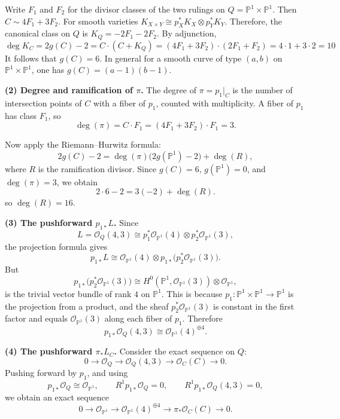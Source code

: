 \documentclass[12pt]{article}
\begin{document}
\begin{solution}
    Write \(F_1\) and \(F_2\) for the divisor classes of the two rulings on \(Q=\mathbb P^1\times \mathbb P^1\). Then $C \sim 4F_1+3F_2$. For smooth varieties $K_{X\times Y}\cong p_X^*K_X\otimes p_Y^*K_Y$. Therefore, the canonical class on \(Q\) is $K_Q = -2F_1-2F_2$.
    By adjunction,
    \[ \deg K_C = 2g(C)-2 = C\cdot (C+K_Q) = 
        (4F_1+3F_2)\cdot (2F_1+F_2)
        =
        4\cdot 1 + 3\cdot 2
        =
        10\] It follows that $g(C)=6$.
    In general for a smooth curve of type \((a,b)\) on \(\mathbb P^1\times \mathbb P^1\), one has $g(C)=(a-1)(b-1)$. 

    \textbf{(2) Degree and ramification of \(\pi\).}
    The degree of \(\pi=p_1|_C\) is the number of intersection points of \(C\) with a fiber of \(p_1\), counted with multiplicity. A fiber of \(p_1\) has class \(F_1\), so
    \[
        \deg(\pi)=C\cdot F_1=(4F_1+3F_2)\cdot F_1=3.
    \]

    Now apply the Riemann--Hurwitz formula:
    \[
        2g(C)-2 = \deg(\pi)\bigl(2g(\mathbb P^1)-2\bigr)+\deg(R),
    \]
    where \(R\) is the ramification divisor. Since \(g(C)=6\), \(g(\mathbb P^1)=0\), and \(\deg(\pi)=3\), we obtain
    \[
        2\cdot 6-2 = 3(-2)+\deg(R).
    \]
    so $\deg(R)=16$.

    \textbf{(3) The pushforward \(p_{1*}L\).}
    Since
    \[
        L=\mathcal O_Q(4,3)\cong p_1^*\mathcal O_{\mathbb P^1}(4)\otimes p_2^*\mathcal O_{\mathbb P^1}(3),
    \]
    the projection formula gives
    \[
        p_{1*}L
        \cong
        \mathcal O_{\mathbb P^1}(4)\otimes p_{1*}\bigl(p_2^*\mathcal O_{\mathbb P^1}(3)\bigr).
    \]
    But
    \[
        p_{1*}\bigl(p_2^*\mathcal O_{\mathbb P^1}(3)\bigr)
        \cong
        H^0(\mathbb P^1,\mathcal O_{\mathbb P^1}(3))\otimes \mathcal O_{\mathbb P^1},
    \] is the trivial vector bundle of rank \(4\) on \(\mathbb P^1\). This is because $p_1:\mathbb P^1\times \mathbb P^1\to \mathbb P^1$ is the projection from a product, and the sheaf $p_2^*\mathcal O_{\mathbb P^1}(3)$ is constant in the first factor and equals $\mathcal O_{\mathbb P^1}(3)$ along each fiber of $p_1$.
    Therefore
    \[
        p_{1*}\mathcal O_Q(4,3)\cong \mathcal O_{\mathbb P^1}(4)^{\oplus 4}.
    \]

    \textbf{(4) The pushforward \(\pi_*L_C\).}
    Consider the exact sequence on \(Q\):
    \[
        0\to \mathcal O_Q \to \mathcal O_Q(4,3)\to \mathcal O_C(C)\to 0.
    \]
    Pushing forward by \(p_1\), and using
    \[
        p_{1*}\mathcal O_Q \cong \mathcal O_{\mathbb P^1},\qquad
        R^1p_{1*}\mathcal O_Q=0,\qquad
        R^1p_{1*}\mathcal O_Q(4,3)=0,
    \]
    we obtain an exact sequence
    \[
        0\to \mathcal O_{\mathbb P^1}\to \mathcal O_{\mathbb P^1}(4)^{\oplus 4}\to \pi_*\mathcal O_C(C)\to 0.
    \]


\end{solution}
\end{document}
